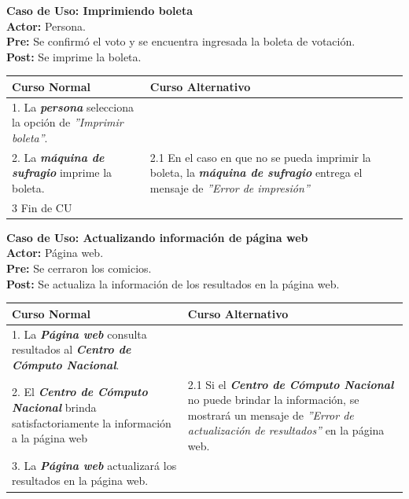 \documentclass[spanish, 10pt,a4paper]{article}
\numberwithin{equation}{section} %
\begin{document}
\newpage
\noindent\textbf{Caso de Uso: Imprimiendo boleta}\\
\textbf{Actor: } Persona.\\
\textbf{Pre: } Se confirmó el voto y se encuentra ingresada la boleta de votación.\\
\textbf{Post: } Se imprime la boleta.\\
\begin{table}[H]
  \centering
\bgroup
\def\arraystretch{1.3}
  \begin{tabular}{p{9cm} | p{7cm}}
    \hline
    Curso Normal & Curso Alternativo \\
    \hline
    \hline    
    1. La \textbf{\textit{persona}} selecciona la opción de \textit{''Imprimir boleta''}. 
    & \\
    
    \hline
    2. La \textbf{\textit{máquina de sufragio}} imprime la boleta.
    &
    2.1 En el caso en que no se pueda imprimir la boleta, la \textbf{\textit{máquina de sufragio}} entrega el mensaje de \textit{''Error de impresión''}
    \\
    
    \hline
    3 Fin de CU
    & \\
    \hline
  \end{tabular}
\egroup
\end{table}


\noindent\textbf{Caso de Uso: Actualizando información de página web}\\
\textbf{Actor: } Página web.\\
\textbf{Pre: } Se cerraron los comicios.\\
\textbf{Post: } Se actualiza la información de los resultados en la página web.\\
\begin{table}[H]
  \centering
  \begin{tabular}{p{9cm} | p{7cm}}
    \hline
    Curso Normal & Curso Alternativo \\
    \hline
    \hline    
    1. La \textbf{\textit{Página web}} consulta resultados al \textbf{\textit{Centro de Cómputo Nacional}}. 
    & \\
    
    \hline
    2. El \textbf{\textit{Centro de Cómputo Nacional}} brinda satisfactoriamente la información a la página web
    & 
    2.1 Si el \textbf{\textit{Centro de Cómputo Nacional}} no puede brindar la información, se mostrará un mensaje de \textit{''Error de actualización de resultados''} en la página web.
    \\
    
    \hline
    3. La \textbf{\textit{Página web}} actualizará los resultados en la página web.
    & \\
    \hline
  \end{tabular}
\end{table}
\end{document}
